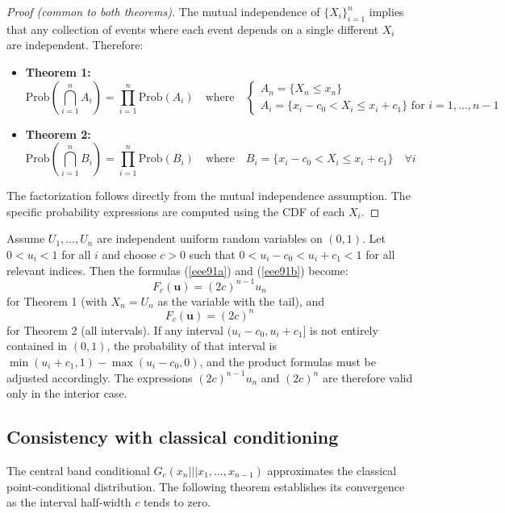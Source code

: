 \begin{proof}[Proof (common to both theorems)]
The mutual independence of $\{X_i\}_{i=1}^n$ implies that any collection of events where each event depends on a single different $X_i$ are independent. Therefore:

\begin{itemize}
\item \textbf{Theorem 1:}
\[
\mathrm{Prob}\left( \bigcap_{i=1}^n A_i \right) = \prod_{i=1}^n \mathrm{Prob}(A_i) \quad \text{where} \quad
\begin{cases}
A_n = \{X_n \leq x_n\} \\
A_i = \{x_i - c_0 < X_i \leq x_i + c_1\} \text{ for } i = 1,\dots,n-1
\end{cases}
\]

\item \textbf{Theorem 2:}
\[
\mathrm{Prob}\left( \bigcap_{i=1}^n B_i \right) = \prod_{i=1}^n \mathrm{Prob}(B_i) \quad \text{where} \quad
B_i = \{x_i - c_0 < X_i \leq x_i + c_1\} \quad \forall i
\]
\end{itemize}
The factorization follows directly from the mutual independence assumption. The specific probability expressions are computed using the CDF of each $X_i$.
\end{proof}

\begin{corollary}
Assume \(U_1,\dots,U_n\) are independent uniform random variables on \((0,1)\). Let \(0<u_i<1\) for all \(i\) and choose \(c>0\) such that \(0 < u_i - c_0 < u_i + c_1 < 1\) for all relevant indices. Then the formulas (\ref{eee91a}) and (\ref{eee91b}) become:
\[
F_c(\mathbf{u}) = (2c)^{n-1} u_n
\]
for Theorem 1 (with \(X_n=U_n\) as the variable with the tail), and
\[
F_c(\mathbf{u}) = (2c)^n
\]
for Theorem 2 (all intervals). If any interval \((u_i-c_0, u_i+c_1]\) is not entirely contained in \((0,1)\), the probability of that interval is \(\min(u_i+c_1,1) - \max(u_i-c_0,0)\), and the product formulas must be adjusted accordingly. The expressions \((2c)^{n-1}u_n\) and \((2c)^n\) are therefore valid only in the interior case.
\end{corollary}



\subsection*{Consistency with classical conditioning}

The central band conditional $G_c(x_n ||| x_1,\dots,x_{n-1})$ approximates the classical point‑conditional distribution. The following theorem establishes its convergence as the interval half‑width $c$ tends to zero.

